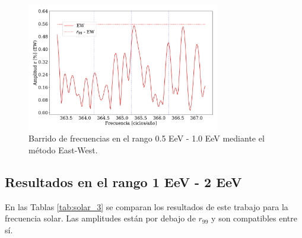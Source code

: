     \begin{figure}[H]
        \begin{small}
            \begin{center}
                \includegraphics[width=0.75\textwidth]{plot_bin_2_barrido_v3_EW.pdf}
            \end{center}
            \caption{Barrido de frecuencias en el  rango 0.5 EeV - 1.0 EeV mediante el método East-West.}
            \label{fig:segundo_barrido}
        \end{small}
    \end{figure}    


\subsection{Resultados en el rango 1 EeV - 2 EeV}

 
En las Tablas \ref{tab:solar_3}  se comparan los resultados de este trabajo  para la frecuencia solar. Las amplitudes están por debajo de $r_{99}$ y son compatibles entre sí.

